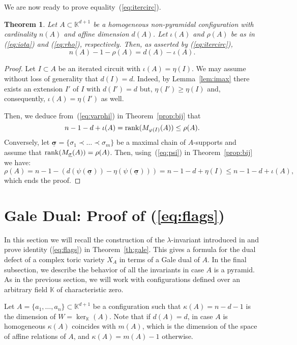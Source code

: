 \documentclass[11pt]{amsart}
\theoremstyle{plain}
\newtheorem{theorem}{Theorem}[section]
\theoremstyle{definition}
\theoremstyle{remark}
\renewcommand{\k}{{\mathbb K}}
\newcommand{\csig}{\ensuremath{\underline{\mathbf \sigma}}}
\numberwithin{equation}{section}
\begin{document}
\smallskip

We are now ready to prove equality~(\ref{eq:itercirc}).

\begin{theorem}\label{th:itercirc}
Let $A \subset \k^{d +1}$ be a homogeneous non-pyramidal
configuration with cardinality $n(A)$ and affine dimension $d(A)$.  Let $\iota(A)$ and  $\rho(A)$ be as in (\ref{eq:iota}) 
and (\ref{eq:rho}), respectively.  Then, as asserted by (\ref{eq:itercirc}),
$$n(A) - 1 - \rho(A) = d(A)  - \iota(A).$$
\end{theorem}

\begin{proof}
Let $I \subset A$ be an iterated circuit 
with $ \iota(A)=\eta(I)$. We may assume without loss of generality that 
$d(I) = d$. Indeed,  by Lemma~\ref{lem:imax} there exists an extension $I'$ of $I$ with $d(I') = d$ but, $\eta(I') \geq \eta(I)$ and, consequently, 
$ \iota(A)=\eta(I')$ as well.
  
Then,  we deduce from~(\ref{eq:varphi}) in Theorem~\ref{prop:bij} that 
$$ n-1 - d  +  \iota(A) ={\rm rank}(M_{\varphi(I)}(A)) \le \rho(A).$$
Conversely, let 
$\csig=\{\sigma_1 \prec \dots \prec \sigma_{m }\}$ 
be  a maximal  chain of $A$-supports and assume that 
${\rm rank}(M_{\csig}(A)) = \rho(A)$. Then,  using~(\ref{eq:psi}) in Theorem~\ref{prop:bij} we have:
$$\rho(A) = n-1 - (d(\psi(\csig)) - \eta(\psi(\csig)) )
= n-1 - d + \eta(I) \le n-1 - d  +  \iota(A),$$
which ends the proof.
\end{proof} 





\section{Gale Dual: Proof of (\ref{eq:flags})}\label{sec:right=}

In this section we will recall the construction of the $\lambda$-invariant introduced in \cite{CC} and prove  identity (\ref{eq:flags}) in Theorem~\ref{th:gale}. 
This gives a formula for the dual defect of a complex toric variety $X_A$ in terms of a Gale dual of $A$.  
In the final subsection, we describe the behavior of  all the invariants in case $A$ is a pyramid. 
As in the previous section, we will work with configurations defined over an arbitrary field $\k$ of characteristic zero.

Let $A = \{a_1,\dots,a_n\} \subset \k^{d + 1}$ be a configuration such that $\kappa(A) = n -d -1$ is the dimension of $W=\ker_\k(A)$.  
Note that if $d(A)=d$, in case $A$ is homogeneous $\kappa(A)$ coincides with $m(A)$, which is the dimension of the space of affine relations of $A$, and $\kappa(A) = m(A)-1$ otherwise.
\end{document}

